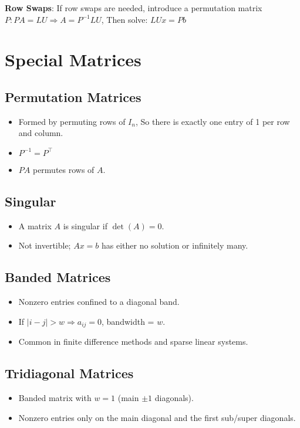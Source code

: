 \documentclass[9pt, letterpaper]{extarticle}
\begin{document}
\begin{multicols*}{3}
  \textbf{Row Swaps}:
  If row swaps are needed, introduce a permutation matrix 
  $P:PA = LU \Rightarrow A = P^{-1}LU$,
  Then solve: $ LUx = Pb $

  \section{Special Matrices}
  \subsection{Permutation Matrices}
  \begin{itemize}
    \item Formed by permuting rows of $I_n$, So there is exactly one entry of 1
      per row and column.
    \item $P^{-1} = P^\top$
    \item $PA$ permutes rows of $A$.
  \end{itemize}

  \subsection{Singular}
  \begin{itemize}
    \item A matrix $A$ is singular if $\det(A) = 0$.
    \item Not invertible; $ Ax = b $ has either no solution or infinitely many.
  \end{itemize}

  \subsection{Banded Matrices}
  \begin{itemize}
    \item Nonzero entries confined to a diagonal band.
    \item If $|i - j| > w \Rightarrow a_{ij} = 0$, bandwidth = $w$.
    \item Common in finite difference methods and sparse linear systems.
  \end{itemize}

  \subsection{Tridiagonal Matrices}
  \begin{itemize}
    \item Banded matrix with $w=1$ (main $\pm 1$ diagonals).
    \item Nonzero entries only on the main diagonal and the first sub/super
      diagonals.
  \end{itemize}


\end{multicols*}
\end{document}
